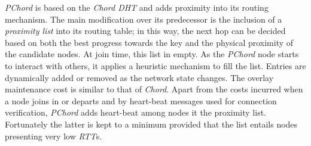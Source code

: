 \emph{PChord} \cite{HLYW2005} is based on the \emph{Chord DHT} and adds
proximity into its routing mechanism. 
The main modification over its predecessor is the inclusion 
of a \emph{proximity list} into its routing table;
in this way, the next hop can be decided based on both the best progress
towards the key and the physical proximity of the candidate nodes.
At join time, this list in empty. 
As the \emph{PChord} node starts to interact with
others, it applies a heuristic mechanism to fill the list. 
Entries are dynamically added or removed as the network state changes. 
The overlay maintenance cost is similar to that of \emph{Chord}. 
Apart from the costs incurred when a  node joins in or departs and 
by heart-beat messages used for connection verification, \emph{PChord} adds
heart-beat among nodes it the proximity list. 
Fortunately the latter is kept to a minimum provided that 
the list entails nodes presenting very low \emph{RTT}s.

